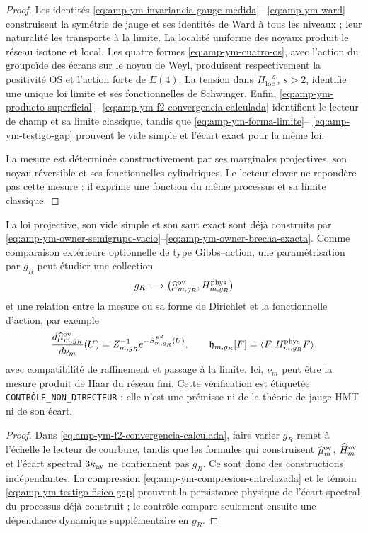 \begin{proof}
Les identités \eqref{eq:amp-ym-invariancia-gauge-medida}--
\eqref{eq:amp-ym-ward} construisent la symétrie de jauge et ses identités de
Ward à tous les niveaux ; leur naturalité les transporte à la limite.  La
localité uniforme des noyaux produit le réseau isotone et local.  Les
quatre formes \eqref{eq:amp-ym-cuatro-os}, avec l’action du groupoïde
des écrans sur le noyau de Weyl, produisent respectivement la positivité
OS et l’action forte de \(E(4)\).  La tension dans
\(H^{-s}_{\rm loc}\), \(s>2\), identifie une unique loi limite et ses
fonctionnelles de Schwinger.  Enfin,
\eqref{eq:amp-ym-producto-superficial}--
\eqref{eq:amp-ym-f2-convergencia-calculada} identifient le lecteur de champ
et sa limite classique, tandis que
\eqref{eq:amp-ym-forma-limite}--
\eqref{eq:amp-ym-testigo-gap} prouvent le vide simple et l’écart exact pour la
même loi.

La mesure est déterminée constructivement par ses marginales projectives, son noyau réversible et ses fonctionnelles cylindriques. Le lecteur clover ne repondère pas cette mesure : il exprime une fonction du même processus et sa limite classique.
\end{proof}

\begin{proposition}
\label{prop:amp-ym-puente-accion-requerido}
La loi projective, son vide simple et son saut exact sont déjà construits par \eqref{eq:amp-ym-owner-semigrupo-vacio}--\eqref{eq:amp-ym-owner-brecha-exacta}. Comme comparaison extérieure optionnelle de type Gibbs--action, une paramétrisation par \(g_R\) peut étudier une collection
\[
 g_R\longmapsto
 \bigl(\widehat\mu_{m,g_R}^{\rm ov},H_{m,g_R}^{\rm phys}\bigr)
\]
et une relation entre la mesure ou sa forme de Dirichlet et la fonctionnelle
d’action, par exemple
\begin{equation}\label{eq:amp-ym-identidad-accion-requerida}
 \frac{d\widehat\mu_{m,g_R}^{\rm ov}}{d\nu_m}(U)
 =Z_{m,g_R}^{-1}e^{-S_{m,g_R}^{F^2}(U)},
 \qquad
 \mathfrak h_{m,g_R}[F]
 =\langle F,H_{m,g_R}^{\rm phys}F\rangle,
\end{equation}
avec compatibilité de raffinement et passage à la limite. Ici, \(\nu_m\) peut
être la mesure produit de Haar du réseau fini. Cette vérification est étiquetée
\texttt{CONTRÔLE\_NON\_DIRECTEUR} : elle n’est une prémisse ni de la théorie de jauge HMT ni
de son écart.
\end{proposition}

\begin{proof}
Dans \eqref{eq:amp-ym-f2-convergencia-calculada}, faire varier \(g_R\) remet à l'échelle le lecteur de courbure, tandis que les formules qui construisent \(\widehat\mu_m^{\rm ov}\), \(\widehat H_m^{\rm ov}\) et l'écart spectral \(3\kappa_{\rm av}\) ne contiennent pas \(g_R\). Ce sont donc des constructions indépendantes. La compression \eqref{eq:amp-ym-compresion-entrelazada} et le témoin \eqref{eq:amp-ym-testigo-fisico-gap} prouvent la persistance physique de l'écart spectral du processus déjà construit ; le contrôle compare seulement ensuite une dépendance dynamique supplémentaire en \(g_R\).
\end{proof}


